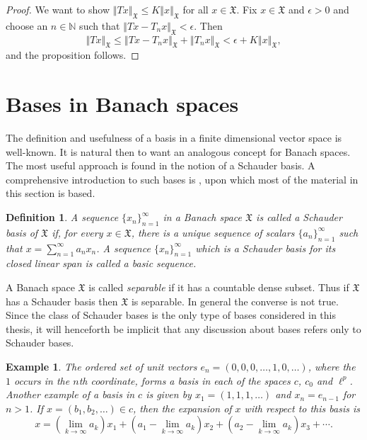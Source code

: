 \documentclass[mmath,12pt]{unswthesis}   %
\newcommand{\N}{\mathbb{N}}
\newcommand{\X}{\mathfrak{X}}
\def\lp{\ell^p}
\def\norm#1{\left \Vert #1 \right \Vert}
\newtheorem{definition}[theorem]{Definition}
\newtheorem{example}[theorem]{Example}
\numberwithin{equation}{section}
\begin{document}
\begin{proof}
We want to show $\norm{Tx}_{\X}\leq K\norm{x}_{\X}$ for all $x\in\X$. Fix
$x\in\X$ and $\epsilon>0$ and choose an $n\in\N$ such that
$\norm{Tx-T_nx}_{\X}<\epsilon$. Then 
\[\norm{Tx}_{\X}\leq\norm{Tx-T_nx}_{\X}+\norm{T_nx}_{\X}
<\epsilon+K\norm{x}_{\X},\]
and the proposition follows.
\end{proof}



\section{Bases in Banach spaces}\label{bases}


The definition and usefulness of a basis in a finite dimensional vector space is
well-known. It is natural then to want an analogous concept for
Banach spaces. The most useful approach is found in the notion of a Schauder
basis. A comprehensive introduction to such bases is \cite[pp. 1--52]{Lind},
upon which most of the material in this section is based. 

\begin{definition}
A sequence $\{x_n\}_{n=1}^{\infty}$ in a Banach space $\X$ is called a {\em 
Schauder basis of $\X$} if, for every $x\in\X$, there is a unique sequence of
scalars $\{a_n\}_{n=1}^{\infty}$ such that $x=\sum_{n=1}^{\infty}a_nx_n$. A
sequence $\{x_n\}_{n=1}^{\infty}$ which is a Schauder basis for its closed
linear span is called a {\em basic sequence}.
\end{definition}

A Banach space $\X$ is called {\em separable} if it has a countable dense 
subset.
Thus if $\X$ has a Schauder basis then $\X$ is separable. In general the 
converse
is not true. Since the class of Schauder bases is the only type of bases
considered in this
thesis, it will henceforth be implicit that any discussion about bases refers
only to Schauder bases.


\begin{example}
The ordered set of unit vectors $e_n=(0,0,0,\ldots,1,0,\ldots)$, where the $1$
occurs in the $n$th coordinate, forms a basis in each of the spaces
$c$, $c_0$ and $\lp$. Another example of a basis in $c$ is given by
$x_1=(1,1,1,\ldots)$
and $x_n=e_{n-1}$ for $n>1$. If $x=(b_1,b_2,\ldots)\in c$, then the expansion of
$x$ with respect to this basis is
\[x=(\lim_{k\rightarrow\infty}a_k)x_1+(a_1-\lim_{k\rightarrow\infty}a_k)x_2+
(a_2-\lim_{k\rightarrow\infty}a_k)x_3+\cdots.\] 
\end{example}
\end{document}

